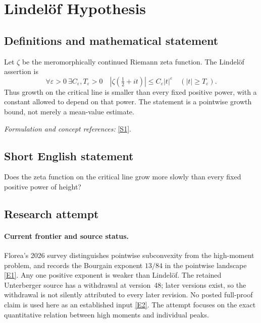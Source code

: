\documentclass[11pt,a4paper]{article}
\numberwithin{equation}{section}
\newcommand{\sref}[2]{\hyperlink{source:#1:#2}{[S#2]}}
\newcommand{\eref}[2]{\hyperlink{extra:#1:#2}{[E#2]}}
\newif\ifshowcatalogue
\newcommand{\cataloguescope}[1]{\ifshowcatalogue
 \paragraph{Exact scope in the supplied catalogue.}
 \begin{quote}\small #1\end{quote}\fi}
\begin{document}
\setcounter{section}{0}
\section*{\texorpdfstring{Lindelöf Hypothesis}{Lindelöf Hypothesis}}\label{1274}
\subsection{Definitions and mathematical statement}
Let $\zeta$ be the meromorphically continued Riemann zeta function. The Lindelöf assertion is
\[
 \forall\varepsilon>0\ \exists C_\varepsilon,T_\varepsilon>0\quad
 |\zeta(\tfrac12+it)|\le C_\varepsilon|t|^\varepsilon
 \quad(|t|\ge T_\varepsilon).
\]
Thus growth on the critical line is smaller than every fixed positive power, with a constant allowed to depend on that power. The statement is a pointwise growth bound, not merely a mean-value estimate.
\par\smallskip\textit{Formulation and concept references:} \sref{1274}{1}.
\cataloguescope{Prove that for every epsilon>0 there is a constant C\_epsilon such that |zeta(1/2+it)| <= C\_epsilon |t|\textasciicircum{}epsilon for all sufficiently large real |t|.}
\subsection{Short English statement}
Does the zeta function on the critical line grow more slowly than every fixed positive power of height?
\subsection{Research attempt}

\paragraph{Current frontier and source status.}
Florea's 2026 survey distinguishes pointwise subconvexity from the high-moment
problem, and records the Bourgain exponent $13/84$ in the pointwise
landscape \eref{1274}{1}. Any one positive exponent is weaker than Lindel\"of.
The retained Unterberger source has a withdrawal at version~48; later
versions exist, so the withdrawal is not silently attributed to every
later revision. No posted full-proof claim is used here as an established
input \eref{1274}{2}. The attempt focuses on the exact quantitative relation
between high moments and individual peaks.
\end{document}
